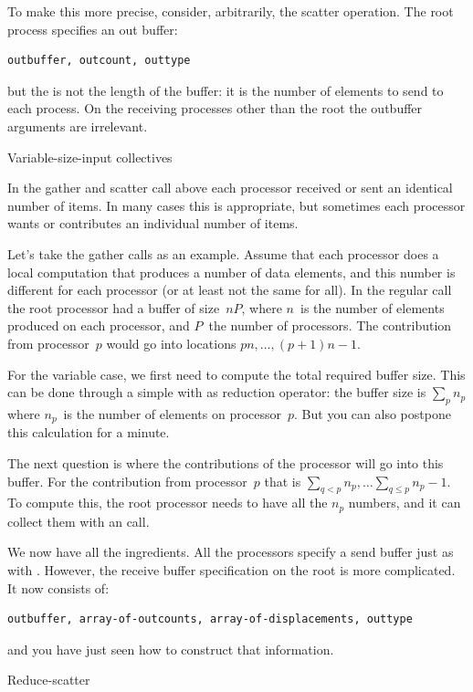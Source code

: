 To make this more precise, consider, arbitrarily,
the scatter operation. The root process specifies an out buffer:
\begin{verbatim}
outbuffer, outcount, outtype
\end{verbatim}
but the  is not the length of the buffer: it is the number
of elements to send to each process.
On the receiving processes other than the root the outbuffer arguments are irrelevant.

 {Variable-size-input collectives}

In the gather and scatter call above each processor received or sent
an identical number of items. In many cases this is appropriate, but
sometimes each processor wants or contributes an individual number of
items. 

Let's take the gather calls as an example. Assume that each processor 
does a local computation that produces a number of data elements,
and this number is different for each processor (or at least not
the same for all). In the regular  call the root processor
had a buffer of size~$nP$, where $n$~is the number of elements produced
on each processor, and $P$~the number of processors. The contribution
from processor~$p$ would go into locations $pn,\ldots,(p+1)n-1$.

For the variable case, we first need to compute the total required
buffer size. This can be done through a simple 
with  as reduction operator:
the buffer size is $\sum_p n_p$ where $n_p$~is the number of elements
on processor~$p$. But you can also postpone
this calculation for a minute. 

The next question is where the contributions of the processor will
go into this buffer. For the contribution from processor~$p$
that is $\sum_{q<p}n_p,\ldots\sum_{q\leq p}n_p-1$. To compute this,
the root processor needs to have all the $n_p$ numbers, and it can collect
them with an  call.

We now have all the ingredients.
All the processors specify a send buffer just as with .
However, the receive buffer specification on the root is more complicated. 
It now consists of:
\begin{verbatim}
outbuffer, array-of-outcounts, array-of-displacements, outtype
\end{verbatim}
and you have just seen how to construct that information.

 {Reduce-scatter}

